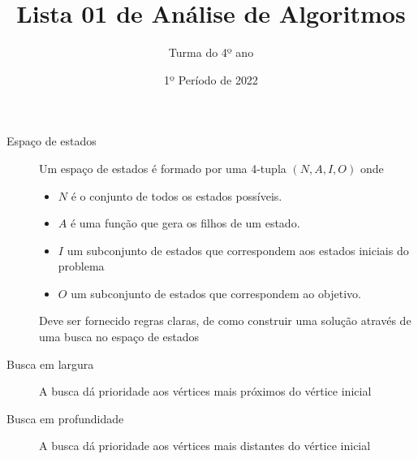\documentclass[12pt]{article}
\title{Lista 01 de Análise de Algoritmos}
\date{1º Período de 2022}
\author{Turma do 4º ano}
\begin{document}
\maketitle

\begin{description}

\item[Espaço de estados]
Um espaço de estados é formado por uma 4-tupla $(N, A, I, O)$ onde
\begin{itemize}
\item $N$ é o conjunto de todos os estados possíveis.
\item $A$ é uma função que gera os filhos de um estado.
\item $I$ um subconjunto de estados que correspondem aos estados iniciais do problema
\item $O$ um subconjunto de estados que correspondem ao objetivo.
\end{itemize}
Deve ser fornecido regras claras, de como construir uma solução através de uma busca no espaço de estados

\item[Busca em largura]
A busca dá prioridade aos vértices mais próximos do vértice inicial

\item[Busca em profundidade]
A busca dá prioridade aos vértices mais distantes do vértice inicial

\end{description}

\break
\end{document}
